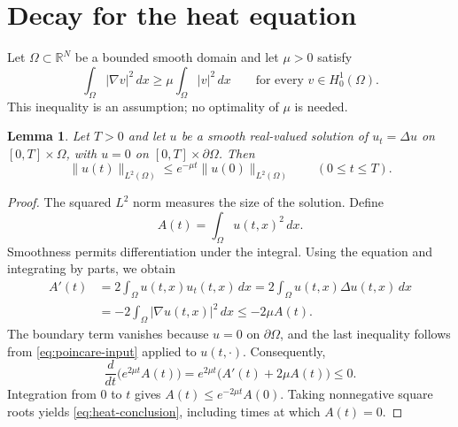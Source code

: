 \documentclass{article}
\newcommand{\Om}{\Omega}
\newtheorem{lemma}{Lemma}
\begin{document}
\section{Decay for the heat equation}
Let $\Om\subset\mathbb R^N$ be a bounded smooth domain and let $\mu>0$
satisfy
\begin{equation}\label{eq:poincare-input}
 \int_{\Om}|\nabla v|^2\,dx\ge\mu\int_{\Om}|v|^2\,dx
 \qquad\text{for every }v\in H_0^1(\Om).
\end{equation}
This inequality is an assumption; no optimality of $\mu$ is needed.
\begin{lemma}\label{lem:heat-decay}
Let $T>0$ and let $u$ be a smooth real-valued solution of
$u_t=\Delta u$ on $[0,T]\times\Om$, with $u=0$ on
$[0,T]\times\partial\Om$. Then
\begin{equation}\label{eq:heat-conclusion}
 \|u(t)\|_{L^2(\Om)}\le e^{-\mu t}\|u(0)\|_{L^2(\Om)}
 \qquad(0\le t\le T).
\end{equation}
\end{lemma}
\begin{proof}
The squared $L^2$ norm measures the size of the solution. Define
\[
 A(t)=\int_{\Om}u(t,x)^2\,dx.
\]
Smoothness permits differentiation under the integral. Using the equation
and integrating by parts, we obtain
\[
 \begin{aligned}
 A'(t)
 &=2\int_{\Om}u(t,x)u_t(t,x)\,dx
 =2\int_{\Om}u(t,x)\Delta u(t,x)\,dx\\
 &=-2\int_{\Om}|\nabla u(t,x)|^2\,dx
 \le -2\mu A(t).
 \end{aligned}
\]
The boundary term vanishes because $u=0$ on $\partial\Om$, and the last
inequality follows from \eqref{eq:poincare-input} applied to $u(t,\cdot)$.
Consequently,
\[
 \frac{d}{dt}\bigl(e^{2\mu t}A(t)\bigr)
 =e^{2\mu t}\bigl(A'(t)+2\mu A(t)\bigr)\le0.
\]
Integration from $0$ to $t$ gives $A(t)\le e^{-2\mu t}A(0)$.
Taking nonnegative square roots yields \eqref{eq:heat-conclusion},
including times at which $A(t)=0$.
\end{proof}
\end{document}
